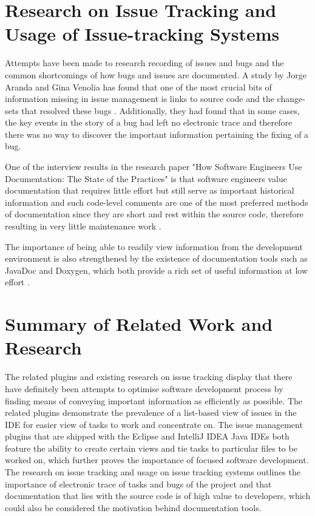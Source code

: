 \documentclass{4thYearProject}
\begin{document}
\section{Research on Issue Tracking and Usage of Issue-tracking Systems}\label{sec:Research}

Attempts have been made to research recording of issues and bugs and the common shortcomings of how bugs and issues are documented. A study by Jorge Aranda and Gina Venolia has found that one of the most crucial bits of information missing in issue management is links to source code and the change-sets that resolved these bugs \cite{lifeofbugs}. Additionally, they had found that in some cases, the key events in the story of a bug had left no electronic trace and therefore there was no way to discover the important information pertaining the fixing of a bug.

One of the interview results in the research paper "How Software Engineers Use Documentation: The State of the Practices" is that software engineers value documentation that requires little effort but still serve as important historical information and such code-level comments are one of the most preferred methods of documentation since they are short and rest within the source code, therefore resulting in very little maintenance work  \cite{stateofpractice}. 

The importance of being able to readily view information from the development environment is also strengthened by the existence of documentation tools such as JavaDoc and Doxygen, which both provide a rich set of useful information at low effort \cite{usingjavadoc}.

\section{Summary of Related Work and Research}

The related plugins and existing research on issue tracking display that there have definitely been attempts to optimise software development process by finding means of conveying important information as efficiently as possible. The related plugins demonstrate the prevalence of a list-based view of issues in the IDE for easier view of tasks to work and concentrate on. The issue management plugins that are shipped with the Eclipse and IntelliJ IDEA Java IDEs both feature the ability to create certain views and tie tasks to particular files to be worked on, which further proves the importance of focused software development. The research on issue tracking and usage on issue tracking systems outlines the importance of electronic trace of tasks and bugs of the project and that documentation that lies with the source code is of high value to developers, which could also be considered the motivation behind documentation tools.
\end{document}
